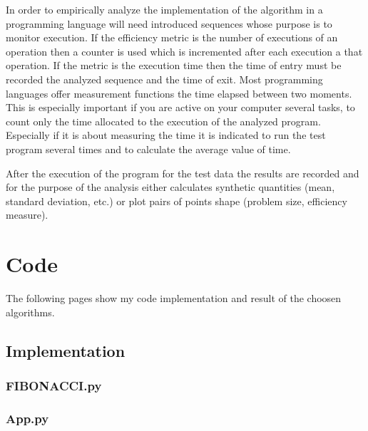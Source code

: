 \documentclass[a4paper, 12pt]{article}
\begin{document}
In order to empirically analyze the implementation of the algorithm in a programming language will need
introduced sequences whose purpose is to monitor execution. If the efficiency metric is the number of
executions of an operation then a counter is used which is incremented after each execution a
that operation. If the metric is the execution time then the time of entry must be recorded
the analyzed sequence and the time of exit. Most programming languages offer measurement functions
the time elapsed between two moments. This is especially important if you are active on your computer
several tasks, to count only the time allocated to the execution of the analyzed program. Especially if
it is about measuring the time it is indicated to run the test program several times and to
calculate the average value of time.

After the execution of the program for the test data the results are recorded and for the purpose of the analysis either
calculates synthetic quantities (mean, standard deviation, etc.) or plot pairs of points
shape (problem size, efficiency measure).

\newpage

\section{Code}

The following pages show my code implementation and result of the choosen algorithms.

\subsection{Implementation}

\subsubsection*{FIBONACCI.py}


\newpage



\newpage

\subsubsection*{App.py}


\newpage
\end{document}
